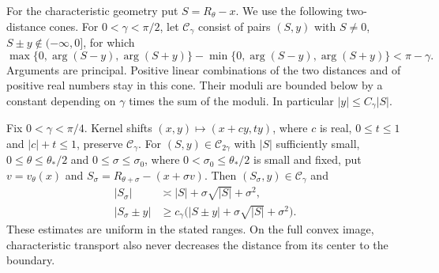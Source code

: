 For the characteristic geometry put $S=R_\theta-x$. We use the
following two-distance cones. For $0<\gamma<\pi/2$, let
$\mathcal C_\gamma$ consist of pairs $(S,y)$ with $S\ne0$,
$S\pm y\notin(-\infty,0]$, for which
\begin{equation}\label{eq:b:cone}
 \max\{0,\arg(S-y),\arg(S+y)\}
 -\min\{0,\arg(S-y),\arg(S+y)\}<\pi-\gamma.
\end{equation}
Arguments are principal. Positive linear combinations of the two
distances and of positive real numbers stay in this cone. Their
moduli are bounded below by a constant depending on $\gamma$ times
the sum of the moduli. In particular $|y|\leq C_\gamma|S|$.

\begin{lmm}\label{lmm:b:cone-transport}
Fix $0<\gamma<\pi/4$. Kernel shifts $(x,y)\mapsto(x+c y,t y)$, where $c$ is real,
$0\leq t\leq1$ and $|c|+t\leq1$, preserve
$\mathcal C_\gamma$. For $(S,y)\in\mathcal C_{2\gamma}$ with
$|S|$ sufficiently small, $0\leq\theta\leq\theta_*/2$ and
$0\leq\sigma\leq\sigma_0$, where $0<\sigma_0\leq\theta_*/2$ is small and fixed,
put $v=v_\theta(x)$ and
$S_\sigma=R_{\theta+\sigma}-(x+\sigma v)$. Then
$(S_\sigma,y)\in\mathcal C_\gamma$ and
\begin{equation}\label{eq:b:transport-distances}
 \begin{aligned}
 |S_\sigma|&\asymp |S|+\sigma\sqrt{|S|}+\sigma^2,\\
 |S_\sigma\pm y|&\geq c_\gamma
       \bigl(|S\pm y|+\sigma\sqrt{|S|}+\sigma^2\bigr).
 \end{aligned}
\end{equation}
These estimates are uniform in the stated ranges. On the full
convex image, characteristic transport also never decreases the
distance from its center to the boundary.
\end{lmm}
